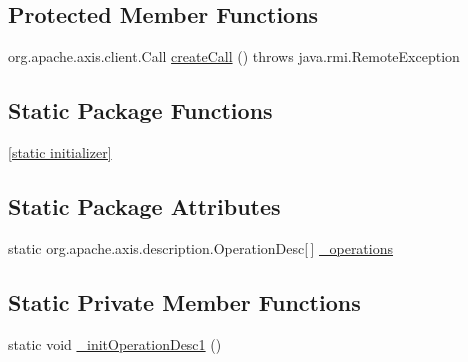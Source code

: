 \subsection*{Protected Member Functions}
\begin{DoxyCompactItemize}
\item 
org.apache.axis.client.Call \hyperlink{classorg_1_1glite_1_1security_1_1voms_1_1service_1_1registration_1_1VOMSRegistrationSoapBindingStub_addf0b4461bdac5b9452e6be446a67d42}{createCall} ()  throws java.rmi.RemoteException 
\end{DoxyCompactItemize}
\subsection*{Static Package Functions}
\begin{DoxyCompactItemize}
\item 
\hyperlink{classorg_1_1glite_1_1security_1_1voms_1_1service_1_1registration_1_1VOMSRegistrationSoapBindingStub_a67bd147ed226899047da8400bf88b775}{\mbox{[}static initializer\mbox{]}}
\end{DoxyCompactItemize}
\subsection*{Static Package Attributes}
\begin{DoxyCompactItemize}
\item 
static org.apache.axis.description.OperationDesc\mbox{[}$\,$\mbox{]} \hyperlink{classorg_1_1glite_1_1security_1_1voms_1_1service_1_1registration_1_1VOMSRegistrationSoapBindingStub_a990be83cb6e1a3679a41ff685fe1f1bc}{\_\-operations}
\end{DoxyCompactItemize}
\subsection*{Static Private Member Functions}
\begin{DoxyCompactItemize}
\item 
static void \hyperlink{classorg_1_1glite_1_1security_1_1voms_1_1service_1_1registration_1_1VOMSRegistrationSoapBindingStub_a927458a354240b0c968cc318b4fe5bb3}{\_\-initOperationDesc1} ()
\end{DoxyCompactItemize}
